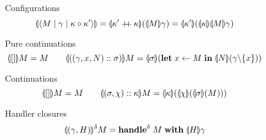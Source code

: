 \documentclass[12pt,phd,lfcs,twoside,openright,logo,leftchapter,normalheadings]{infthesis}
\theoremstyle{plain}
\theoremstyle{definition}
\begin{document}
\begin{figure}[t]
\flushleft
\newcommand{\contapp}[2]{#1 #2}
\newcommand{\contappp}[2]{#1(#2)}
%
Configurations
\begin{displaymath}
\inv{\cek{M \mid \env \mid \shk \circ \shk'}} = \contappp{\inv{\shk' \concat \shk}}{\inv{M}\env}
                                              = \contappp{\inv{\shk'}}{\contapp{\inv{\shk}}{\inv{M}\env}}
\end{displaymath}

Pure continuations
\begin{displaymath}
\contapp{\inv{[]}}{M} = M \qquad \contapp{\inv{((\env, x, N) \cons \slk)}}{M}
  = \contappp{\inv{\slk}}{\Let\; x \revto M \;\In\; \inv{N}(\env \res \{x\})}
\end{displaymath}

Continuations
\begin{displaymath}
\contapp{\inv{[]}}{M}
  = M \qquad
\contapp{\inv{(\slk, \chi) \cons \shk}}{M}
  = \contapp{\inv{\shk}}{(\contappp{\inv{\chi}}{\contappp{\inv{\slk}}{M}})}
\end{displaymath}

Handler closures
\begin{displaymath}
\contapp{\inv{(\env, H)}^\depth}{M}
  = \Handle^\depth\;M\;\With\;\inv{H}\env
\end{displaymath}


\end{figure}
\end{document}
